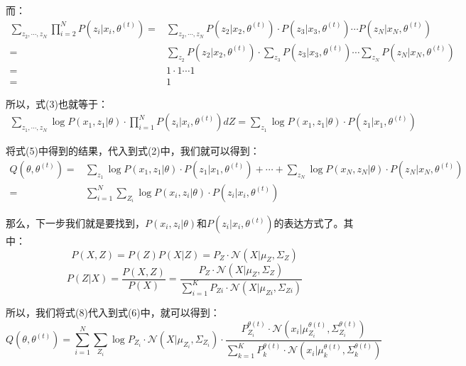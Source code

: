\documentclass[a4paper]{article}
\begin{document}
而：
\begin{equation}
    \begin{split}
        \sum_{z_2,\cdots,z_N} \prod_{i=2}^N P(z_i|x_i,\theta^{(t)}) 
        = & \sum_{z_2,\cdots,z_N} P(z_2|x_2,\theta^{(t)})\cdot P(z_3|x_3,\theta^{(t)})\cdots P(z_N|x_N,\theta^{(t)}) \\
        = & \sum_{z_2} P(z_2|x_2,\theta^{(t)})\cdot \sum_{z_3} P(z_3|x_3,\theta^{(t)})\cdots \sum_{z_N} P(z_N|x_N,\theta^{(t)}) \\
        = & 1 \cdot 1 \cdots 1 \\
        = & 1 
    \end{split}
\end{equation}

所以，式(3)也就等于：
\begin{equation}
    \begin{split}
        \sum_{z_1,\cdots,z_N} \log P(x_1,z_1|\theta) \cdot \prod_{i=1}^N P(z_i|x_i,\theta^{(t)}) dZ = \sum_{z_1} \log P(x_1,z_1|\theta) \cdot  P(z_1|x_1,\theta^{(t)})
    \end{split}
\end{equation}

将式(5)中得到的结果，代入到式(2)中，我们就可以得到：
\begin{equation}
    \begin{split}
         Q(\theta,\theta^{(t)}) 
        = & \sum_{z_1} \log P(x_1,z_1|\theta) \cdot  P(z_1|x_1,\theta^{(t)}) + \cdots +  \sum_{z_N} \log P(x_N,z_N|\theta) \cdot  P(z_N|x_N,\theta^{(t)}) \\
        = & \sum_{i=1}^N \sum_{Z_i} \log P(x_i,z_i|\theta) \cdot  P(z_i|x_i,\theta^{(t)})
    \end{split}
\end{equation}

那么，下一步我们就是要找到，$P(x_i,z_i|\theta)$和$P(z_i|x_i,\theta^{(t)})$的表达方式了。其中：
\begin{equation}
    P(X,Z) = P(Z)P(X|Z) = P_Z\cdot \mathcal{N}(X|\mu_Z,\Sigma_Z)
\end{equation}
\begin{equation}
    P(Z|X) = \frac{P(X,Z)}{P(X)} = \frac{P_Z\cdot \mathcal{N}(X|\mu_Z,\Sigma_Z)}{\sum_{i=1}^K P_{Zi}\cdot \mathcal{N}(X|\mu_{Zi},\Sigma_{Zi})}
\end{equation}

所以，我们将式(8)代入到式(6)中，就可以得到：
\begin{equation}
     Q(\theta,\theta^{(t)})  =    \sum_{i=1}^N \sum_{Z_i} \log P_{Z_i}\cdot \mathcal{N}(X|\mu_{Z_i},\Sigma_{Z_i}) \cdot \frac{P_{Z_i}^{\theta(t)}\cdot \mathcal{N}(x_i|\mu_{Z_i}^{\theta(t)},\Sigma_{Z_i}^{\theta(t)})}{\sum_{k=1}^K P_k^{\theta(t)}\cdot \mathcal{N}(x_i|\mu_k^{\theta(t)},\Sigma_k^{\theta(t)})}
\end{equation}
\end{document}
